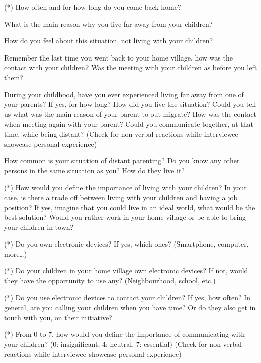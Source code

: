 \begin{todolist}
    \item (*) How often and for how long do you come back home? 
    \item What is the main reason why you live far away from your children?
    \item How do you feel about this situation, not living with your children?
    \item Remember the last time you went back to your home village, how was the contact with your children? Was the meeting with your children as before you left them?
    \item During your childhood, have you ever experienced living far away from one of your parents? If yes, for how long? How did you live the situation? Could you tell us what was the main reason of your parent to out-migrate? How was the contact when meeting again with your parent? Could you communicate together, at that time, while being distant? (Check for non-verbal reactions while interviewee showcase personal experience)
    \item How common is your situation of distant parenting? Do you know any other persons in the same situation as you? How do they live it?
    \item (*) How would you define the importance of living with your children? In your case, is there a trade off between living with your children and having a job position? If yes, imagine that you could live in an ideal world, what would be the best solution? Would you rather work in your home village or be able to bring your children in town?
    \item (*) Do you own electronic devices? If yes, which ones? (Smartphone, computer, more…)
    \item (*) Do your children in your home village own electronic devices? If not, would they have the opportunity to use any? (Neighbourhood, school, etc.)
    \item (*) Do you use electronic devices to contact your children? If yes, how often? In general, are you calling your children when you have time? Or do they also get in touch with you, on their initiative?
    \item (*) From 0 to 7, how would you define the importance of communicating with your children? (0: insignificant, 4: neutral, 7: essential) (Check for non-verbal reactions while interviewee showcase personal experience)
\end{todolist}

\vspace{2pt}
